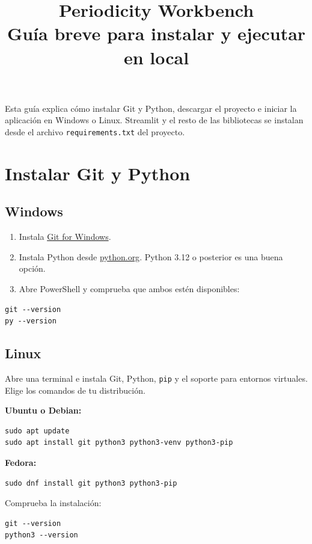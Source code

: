 \documentclass[11pt,a4paper]{article}
\title{\textcolor{accent}{Periodicity Workbench}\\[3pt]
\large Guía breve para instalar y ejecutar en local}
\author{}
\date{}
\begin{document}
\maketitle
\vspace{-1.2em}

Esta guía explica cómo instalar Git y Python, descargar el proyecto e iniciar la aplicación en Windows o Linux. Streamlit y el resto de las bibliotecas se instalan desde el archivo \texttt{requirements.txt} del proyecto.

\section{Instalar Git y Python}

\subsection{Windows}
\begin{enumerate}[leftmargin=*]
  \item Instala \href{https://git-scm.com/install/win}{Git for Windows}.
  \item Instala Python desde \href{https://www.python.org/downloads/}{python.org}. Python 3.12 o posterior es una buena opción.
  \item Abre PowerShell y comprueba que ambos estén disponibles:
\end{enumerate}

\begin{lstlisting}
git --version
py --version
\end{lstlisting}

\subsection{Linux}
Abre una terminal e instala Git, Python, \texttt{pip} y el soporte para entornos virtuales. Elige los comandos de tu distribución.

\textbf{Ubuntu o Debian:}
\begin{lstlisting}
sudo apt update
sudo apt install git python3 python3-venv python3-pip
\end{lstlisting}

\textbf{Fedora:}
\begin{lstlisting}
sudo dnf install git python3 python3-pip
\end{lstlisting}

Comprueba la instalación:
\begin{lstlisting}
git --version
python3 --version
\end{lstlisting}
\end{document}
